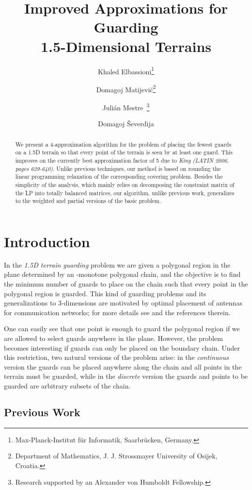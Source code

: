 \documentclass[11pt]{article}
\title{Improved Approximations for Guarding \\ 1.5-Dimensional Terrains }
\author{Khaled Elbassioni\thanks{Max-Planck-Institut f\"ur
	Informatik, Saarbr\"ucken, Germany.}
        \and
        Domagoj Matijevi\'c\thanks{Department of Mathematics,
		J. J. Strossmayer University of Osijek, Croatia.}
		\and
		Juli\'{a}n Mestre\footnotemark[1]\ \thanks{Research supported by an
                  Alexander von Humboldt Fellowship.}
    \and
		Domagoj \v{S}everdija\footnotemark[2]
}
\date{}
\begin{document}
\maketitle


\begin{abstract}
  We present a 4-approximation algorithm for the problem of placing the fewest
  guards on a 1.5D terrain so that every point of the terrain is seen by at
  least one guard.  This improves on the currently best approximation factor
  of 5 due to {\it King (LATIN 2006, pages 629-640)}. Unlike previous
  techniques, our method is based on rounding the linear programming
  relaxation of the corresponding covering problem. Besides the simplicity of
  the analysis, which mainly relies on decomposing the constraint matrix of
  the LP into totally balanced matrices, our algorithm, unlike previous work,
  generalizes to the weighted and partial versions of the basic problem.
\end{abstract}




\section{Introduction}
\label{sec:introduction}

In the \emph{1.5D terrain guarding} problem we are given a polygonal region in
the plane determined by an -monotone polygonal chain, and the objective is
to find the minimum number of guards to place on the chain such that every
point in the polygonal region is guarded. This kind of guarding problems and
its generalizations to 3-dimensions are motivated by optimal placement of
antennas for communication networks; for more details see
\cite{conf/cccg/ChenEU95,journals/siamcomp/Ben-MosheKM07} and the references
therein.

One can easily see that one point is enough to guard the polygonal region if
we are allowed to select guards anywhere in the plane. However, the problem
becomes interesting if guards can only be placed on the boundary chain. Under
this restriction, two natural versions of the problem arise: in the
\emph{continuous} version the guards can be placed anywhere along the chain
and all points in the terrain must be guarded, while in the \emph{discrete}
version the guards and points to be guarded are arbitrary subsets of the
chain.

\subsection{Previous Work}
\label{sec:prev-work}
\end{document}
